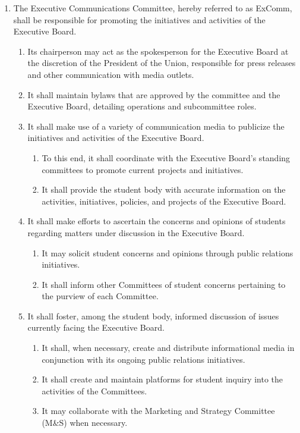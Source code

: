 \begin{enumerate}
\begin{enumerate}
  \end{enumerate}
\item The Executive Communications Committee, hereby referred to as ExComm, shall be responsible for promoting the initiatives and activities of the Executive Board.
  \begin{enumerate}
  \item Its chairperson may act as the spokesperson for the Executive Board at the discretion of the President of the Union, responsible for press releases and other communication with media outlets.
  \item It shall maintain bylaws that are approved by the committee and the Executive Board, detailing operations and subcommittee roles.
  \item It shall make use of a variety of communication media to publicize the initiatives and activities of the Executive Board.
    \begin{enumerate}
    \item To this end, it shall coordinate with the Executive Board’s standing committees to promote current projects and initiatives.
    \item It shall provide the student body with accurate information on the activities, initiatives, policies, and projects of the Executive Board.
    \end{enumerate}
  \item It shall make efforts to ascertain the concerns and opinions of students regarding matters under discussion in the Executive Board.
    \begin{enumerate}
    \item It may solicit student concerns and opinions through public relations initiatives.
    \item It shall inform other Committees of student concerns pertaining to the purview of each Committee.
    \end{enumerate}
  \item It shall foster, among the student body, informed discussion of issues currently facing the Executive Board.
    \begin{enumerate}
    \item It shall, when necessary, create and distribute informational media in conjunction with its ongoing public relations initiatives.
    \item It shall create and maintain platforms for student inquiry into the activities of the Committees.
    \item It may collaborate with the Marketing and Strategy Committee (M\&S) when necessary.

\end{enumerate}
\end{enumerate}
\end{enumerate}
